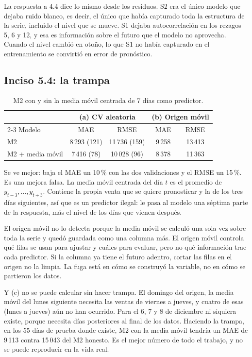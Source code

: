 \documentclass[11pt]{article}
\begin{document}
La respuesta a 4.4 dice lo mismo desde los residuos. S2 era el único modelo que dejaba ruido
blanco, es decir, el único que había capturado toda la estructura de la serie, incluido el nivel
que se mueve. S1 dejaba autocorrelación en los rezagos 5, 6 y 12, y esa es información sobre el
futuro que el modelo no aprovecha. Cuando el nivel cambió en otoño, lo que S1 no había capturado
en el entrenamiento se convirtió en error de pronóstico.

\subsection*{Inciso 5.4: la trampa}

\begin{table}[H]
\centering
\caption{M2 con y sin la media móvil centrada de 7 días como predictor.}\label{tab:trampa}
\begin{tabular}{|l|c|c|c|c|}
\hline
& \multicolumn{2}{c|}{(a) CV aleatoria} & \multicolumn{2}{c|}{(b) Origen móvil} \\
\cline{2-3}\cline{4-5}
Modelo & MAE & RMSE & MAE & RMSE \\
\hline
M2 & 8\,293 (121) & 11\,736 (159) & 9\,258 & 13\,413 \\
M2 + media móvil & 7\,416 (78) & 10\,028 (96) & 8\,378 & 11\,363 \\
\hline
\end{tabular}
\end{table}

Se ve mejor: baja el MAE un 10\,\% con las dos validaciones y el RMSE un 15\,\%. Es una mejora
falsa. La media móvil centrada del día $t$ es el promedio de $y_{t-3},\dots,y_{t+3}$. Contiene la
propia venta que se quiere pronosticar y la de los tres días siguientes, así que es un
predictor ilegal: le pasa al modelo una séptima parte de la respuesta, más el nivel de
los días que vienen después.

El origen móvil no lo detecta porque la media móvil se calculó una sola vez sobre toda la serie y
quedó guardada como una columna más. El origen móvil controla qué filas se usan para
ajustar y cuáles para evaluar, pero no qué información trae cada predictor. Si la columna ya
tiene el futuro adentro, cortar las filas en el origen no la limpia. La fuga está en cómo se
construyó la variable, no en cómo se partieron los datos.

Y (c) no se puede calcular sin hacer trampa. El domingo del origen, la media móvil del
lunes siguiente necesita las ventas de viernes a jueves, y cuatro de esas (lunes a jueves) aún no
han ocurrido. Para el 6, 7 y 8 de diciembre ni siquiera existe, porque necesita días posteriores al
final de los datos. Haciendo la trampa, en los 55 días de prueba donde existe, M2 con la media
móvil tendría un MAE de \textsterling{}9\,113 contra \textsterling{}15\,043 del M2 honesto. Es el mejor número de todo el
trabajo, y no se puede reproducir en la vida real.
\end{document}

